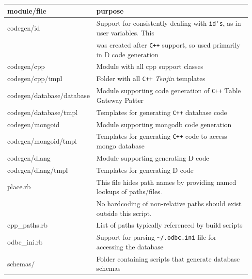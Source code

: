 \documentclass[11pt]{article}
\begin{document}
\begin{center}
\begin{tabular}{ll}
 module/file                &  purpose                                                                                   \\
\hline
 codegen/id                 &  Support for consistently dealing with \texttt{id's}, as in user variables. This           \\
                            &  was created after \texttt{C++} support, so used primarily in D code generation            \\
 codegen/cpp                &  Module with all cpp support classes                                                       \\
 codegen/cpp/tmpl           &  Folder with all \texttt{C++} \emph{Tenjin} templates                                      \\
 codegen/database/database  &  Module supporting code generation of \texttt{C++} Table Gateway Patter                    \\
 codegen/database/tmpl      &  Templates for generating \texttt{C++} database code                                       \\
 codegen/mongoid            &  Module supporting mongodb code generation                                                 \\
 codegen/mongoid/tmpl       &  Templates for generating \texttt{C++} code to access mongo database                       \\
 codegen/dlang              &  Module supporting generating D code                                                       \\
 codegen/dlang/tmpl         &  Templates for generating D code                                                           \\
 place.rb                   &  This file hides path names by providing named lookups of paths/files.                     \\
                            &  No hardcoding of non-relative paths should exist outside this script.                     \\
 cpp\_{}paths.rb            &  List of paths typically referenced by build scripts                                       \\
 odbc\_{}ini.rb             &  Support for parsing \texttt{\textasciitilde{}/.odbc.ini} file for accessing the database  \\
 schemas/                   &  Folder containing scripts that generate database schemas                                  \\

\end{tabular}
\end{center}
\end{document}
